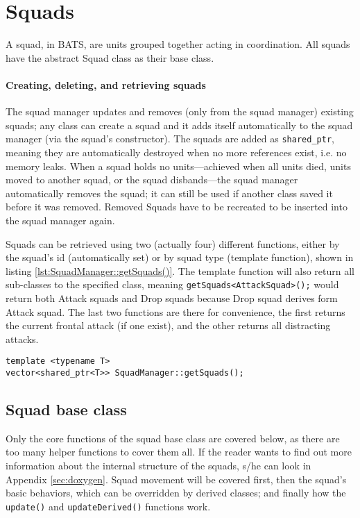 \section{Squads}
A squad, in BATS, are units grouped together acting in coordination. All squads have the abstract
Squad class as their base class. 

\paragraph{Creating, deleting, and retrieving squads}
The squad manager updates and removes (only from the squad manager) existing squads; any class
can create a squad and it adds itself automatically to the squad manager (via the squad's
constructor). The squads are added as \texttt{shared\_ptr}, meaning they are automatically destroyed
when no more references exist, i.e. no memory leaks. When a squad holds no units—achieved when all
units died, units moved to another squad, or the squad disbands—the squad manager automatically
removes the squad; it can still be used if another class saved it before it was removed. Removed Squads
have to be recreated to be inserted into the squad manager again.

Squads can be retrieved using two (actually four) different functions, either by the squad's id
(automatically set) or by squad type (template function), shown in listing
\ref{lst:SquadManager::getSquads()}. The template function will also return all sub-classes to the
specified class, meaning \texttt{getSquads<AttackSquad>();} would return both Attack squads and Drop
squads because Drop squad derives form Attack squad. The last two functions are there for
convenience, the first returns the current frontal attack (if one exist), and the other returns all
distracting attacks.
\begin{lstlisting}[caption={Template function to retrieve squads of the specified type},label={lst:SquadManager::getSquads()}]
template <typename T>
vector<shared_ptr<T>> SquadManager::getSquads();
\end{lstlisting}

\subsection{Squad base class}
Only the core functions of the squad base class are covered below, as there are too many helper
functions to cover them all. If the reader wants to find out more information about the internal
structure of the squads, s/he can look in Appendix \ref{sec:doxygen}. Squad movement will be covered
first, then the squad's basic behaviors, which can be overridden by derived classes; and finally how
the \texttt{update()} and \texttt{updateDerived()} functions work.

